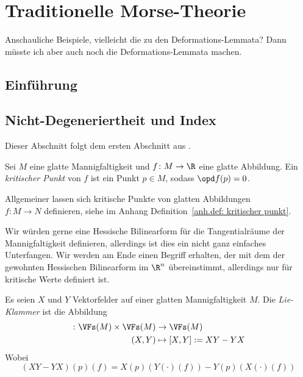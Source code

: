 \chapter{Traditionelle Morse-Theorie}

Anschauliche Beispiele, vielleicht die zu den Deformations-Lemmata? Dann müsste
ich aber auch noch die Deformations-Lemmata machen.

\section{Einführung}

\section{Nicht-Degeneriertheit und Index}

Dieser Abschnitt folgt dem ersten Abschnitt aus \cite{milnor}.

\begin{definition}
    \label{def: kritischer Punkt}
    Sei $M$ eine glatte Mannigfaltigkeit und $f \colon M \to \R$ eine glatte Abbildung. 
    Ein \textit{kritischer Punkt} von $f$ ist ein Punkt $p \in M$, sodass $\opd f (p) = 0$.
\end{definition}

\begin{remark}
    Allgemeiner lassen sich kritische Punkte von glatten Abbildungen \\ $f \colon M \to N$ 
    definieren, siehe im Anhang Definition~\ref{anh.def: kritischer punkt}.
\end{remark}

Wir würden gerne eine Hessische Bilinearform für die Tangentialräume der Mannigfaltigkeit
definieren, allerdings ist dies ein nicht ganz einfaches Unterfangen. Wir werden am Ende
einen Begriff erhalten, der mit dem der gewohnten Hessischen Bilinearform im $\R^n$
übereinstimmt, allerdings nur für kritische Werte definiert ist.

\begin{definition}
    \label{def: lie-klammer}
    Es seien $X$ und $Y$ Vektorfelder auf einer glatten Mannigfaltigkeit $M$. Die 
    \textit{Lie-Klammer} ist die Abbildung 
    \begin{align*} 
        [\cdot, \cdot] \colon \VFs(M) \times \VFs(M) & \to \VFs(M) \\
        (X, Y) & \mapsto [X, Y] := XY - YX
    \end{align*}
    Wobei 
    \[ (XY - YX) (p) (f) = X(p)(Y(\cdot)(f)) - Y(p)(X(\cdot)(f)) \]
\end{definition}

